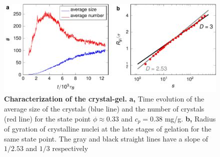 \documentclass[preprint,amsmath,amssymb,superscriptaddress]{revtex4-1}
\begin{document}
\begin{figure}[!t]
 \centering
 \includegraphics{characterisation}
\caption{{\bf Characterization of the crystal-gel.} {\bf a,} Time evolution of the average size of the crystals (blue line) and the number of crystals (red line) for the state point $\phi\approx 0.33$ and $c_p=0.38$ mg/g. {\bf b,} Radius of gyration of crystalline nuclei at the late stages of gelation for the same state point. 
The gray and black straight lines have a slope of $1/2.53$ and $1/3$ respectively} 
 \label{fig:crystals}
\end{figure}

\clearpage 
\end{document}
